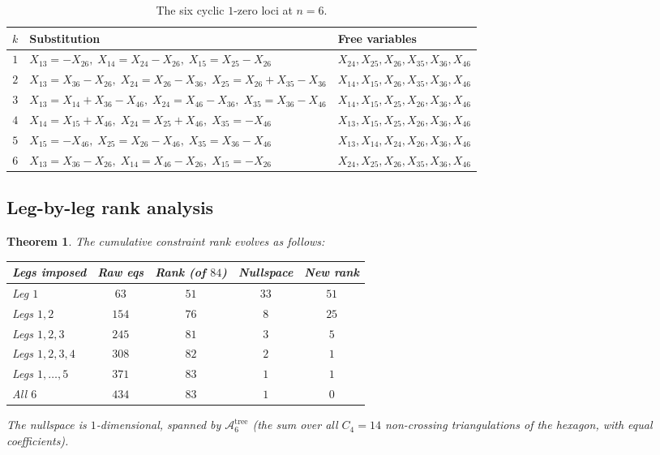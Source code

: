 \documentclass[11pt]{article}
\theoremstyle{plain}
\newtheorem{theorem}{Theorem}[section]
\theoremstyle{definition}
\newcommand{\cA}{\mathcal{A}}
\begin{document}
\begin{table}[ht]
\centering
\small
\begin{tabular}{c|l|l}
\toprule
$k$ & Substitution & Free variables \\
\midrule
$1$ & $X_{13}=-X_{26},\; X_{14}=X_{24}-X_{26},\; X_{15}=X_{25}-X_{26}$
    & $X_{24},X_{25},X_{26},X_{35},X_{36},X_{46}$ \\
$2$ & $X_{13}=X_{36}-X_{26},\; X_{24}=X_{26}-X_{36},\; X_{25}=X_{26}+X_{35}-X_{36}$
    & $X_{14},X_{15},X_{26},X_{35},X_{36},X_{46}$ \\
$3$ & $X_{13}=X_{14}+X_{36}-X_{46},\; X_{24}=X_{46}-X_{36},\; X_{35}=X_{36}-X_{46}$
    & $X_{14},X_{15},X_{25},X_{26},X_{36},X_{46}$ \\
$4$ & $X_{14}=X_{15}+X_{46},\; X_{24}=X_{25}+X_{46},\; X_{35}=-X_{46}$
    & $X_{13},X_{15},X_{25},X_{26},X_{36},X_{46}$ \\
$5$ & $X_{15}=-X_{46},\; X_{25}=X_{26}-X_{46},\; X_{35}=X_{36}-X_{46}$
    & $X_{13},X_{14},X_{24},X_{26},X_{36},X_{46}$ \\
$6$ & $X_{13}=X_{36}-X_{26},\; X_{14}=X_{46}-X_{26},\; X_{15}=-X_{26}$
    & $X_{24},X_{25},X_{26},X_{35},X_{36},X_{46}$ \\
\bottomrule
\end{tabular}
\caption{The six cyclic $1$-zero loci at $n=6$.}
\label{tab:loci6}
\end{table}

\subsection{Leg-by-leg rank analysis}

\begin{theorem}\label{thm:n6}
The cumulative constraint rank evolves as follows:
\begin{center}
\begin{tabular}{lcccc}
\toprule
Legs imposed & Raw eqs & Rank (of $84$) & Nullspace & New rank \\
\midrule
Leg $1$          & $63$  & $51$ & $33$ & $51$ \\
Legs $1, 2$      & $154$ & $76$ & $8$  & $25$ \\
Legs $1, 2, 3$   & $245$ & $81$ & $3$  & $5$  \\
Legs $1,2,3,4$   & $308$ & $82$ & $2$  & $1$  \\
Legs $1,\ldots,5$& $371$ & $83$ & $1$  & $1$  \\
All $6$          & $434$ & $83$ & $1$  & $0$  \\
\bottomrule
\end{tabular}
\end{center}
The nullspace is $1$-dimensional, spanned by $\cA_6^{\mathrm{tree}}$ (the sum over
all $C_4 = 14$ non-crossing triangulations of the hexagon, with equal coefficients).
\end{theorem}
\end{document}
